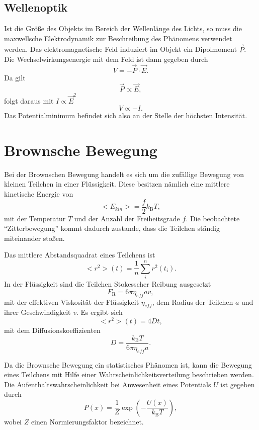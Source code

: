 \subsection{Wellenoptik}

Ist die Größe des Objekts im Bereich der Wellenlänge des Lichts, so muss die maxwellsche Elektrodynamik zur Beschreibung des Phänomens verwendet werden. Das elektromagnetische Feld induziert im Objekt ein Dipolmoment $\vec{P}$. Die Wechselwirkungsenergie mit dem Feld ist dann gegeben durch
\begin{equation}
 V = -\vec{P}\cdot\vec{E}.
\end{equation}
Da gilt
\begin{equation}
 \vec{P} \propto \vec{E},
\end{equation}
folgt daraus mit $I\propto\vec{E}^{2}$
\begin{equation}
 V \propto -I.
\end{equation}
Das Potentialminimum befindet sich also an der Stelle der höchsten Intensität.

\section{Brownsche Bewegung}

Bei der Brownschen Bewegung handelt es sich um die zufällige Bewegung von kleinen Teilchen in einer Flüssigkeit. Diese besitzen nämlich eine mittlere kinetische Energie von 
\begin{equation}
 <E_{kin}> = \frac{f}{2}k_{\textrm{B}}T,
\end{equation}
mit der Temperatur $T$ und der Anzahl der Freiheitsgrade $f$. Die beobachtete ``Zitterbewegung'' kommt dadurch zustande, dass die Teilchen ständig miteinander stoßen.

Das mittlere Abstandsquadrat eines Teilchens ist \cite{Litmap}
\begin{equation}
 <r^{2}>(t) = \frac{1}{n}\sum_{i}^{n}r^{2}(t_{i}).
\end{equation}
In der Flüssigkeit sind die Teilchen Stokesscher Reibung ausgesetzt
\begin{equation}
 F_{\textrm{R}} = 6\pi\eta_{eff}av,
\end{equation}
mit der effektiven Viskosität der Flüssigkeit $\eta_{eff}$, dem Radius der Teilchen $a$ und ihrer Geschwindigkeit $v$. Es ergibt sich
\begin{equation}
 <r^{2}>(t) = 4Dt,
\end{equation}
mit dem Diffusionskoeffizienten
\begin{equation}
 D = \frac{k_{\textrm{B}}T}{6\pi\eta_{eff}a}.
\end{equation}

Da die Brownsche Bewegung ein statistisches Phänomen ist, kann die Bewegung eines Teilchens mit Hilfe einer Wahrscheinlichkeitsverteilung beschrieben werden. Die Aufenthaltswahrscheinlichkeit bei Anwesenheit eines Potentials $U$ ist gegeben durch \cite{Litmap}
\begin{equation}
 P(x) = \frac{1}{Z}\exp\left(-\frac{U(x)}{k_{\textrm{B}}T}\right),
\end{equation}
wobei $Z$ einen Normierungsfaktor bezeichnet.



